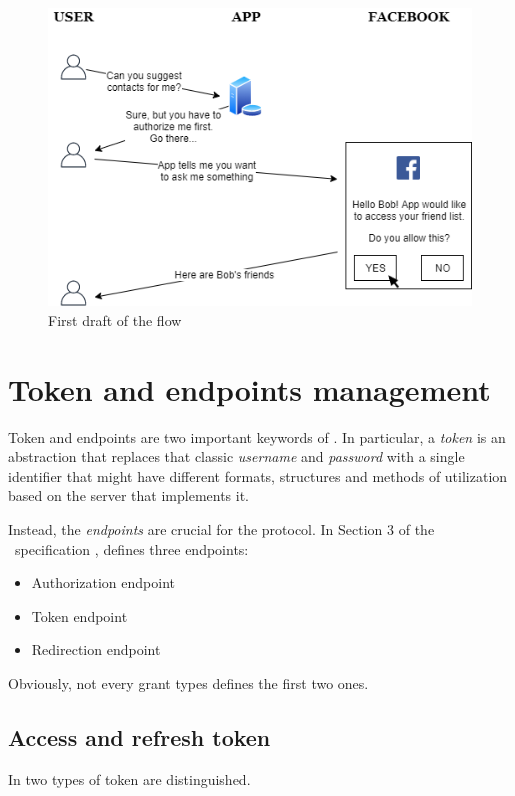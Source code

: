\begin{figure}
    \centering
    \includegraphics[scale=0.74]{chapters/images/chp2/flow1.png}
    \caption{First draft of the flow}
    \label{fig:flow1}
    \vspace{0.5cm}
\end{figure}

\vspace{1cm}

\section{Token and endpoints management}
Token and endpoints are two important keywords of \textit{\oauth}. In particular, a \textit{token} is an abstraction that replaces that classic \textit{username} and \textit{password} with a single identifier that might have different formats, structures and methods of utilization based on the server that implements it.

Instead, the \textit{endpoints} are crucial for the protocol. In Section 3 of the \ specification \cite{RFC6749}, \textit{\oauth} defines three endpoints:

\begin{itemize}
    \item Authorization endpoint
    \item Token endpoint
    \item Redirection endpoint
\end{itemize}

Obviously, not every grant types defines the first two ones.

\subsection{Access and refresh token}
\label{accref}
In \textit{\oauth} two types of token are distinguished.

